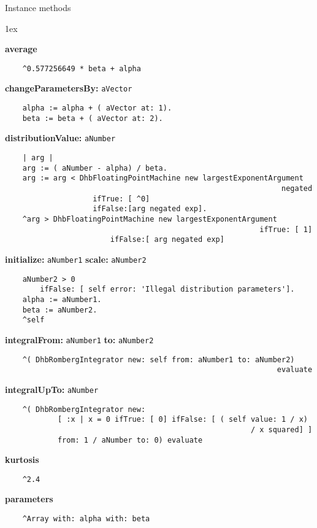 Instance methods
{\parskip 1ex\par\noindent}
{\bf average}
\begin{verbatim}
    ^0.577256649 * beta + alpha

\end{verbatim}
{\bf changeParametersBy:} {\tt aVector}
\begin{verbatim}
    alpha := alpha + ( aVector at: 1).
    beta := beta + ( aVector at: 2).

\end{verbatim}
{\bf distributionValue:} {\tt aNumber}
\begin{verbatim}
    | arg |
    arg := ( aNumber - alpha) / beta.
    arg := arg < DhbFloatingPointMachine new largestExponentArgument 
                                                               negated
                    ifTrue: [ ^0]
                    ifFalse:[arg negated exp].
    ^arg > DhbFloatingPointMachine new largestExponentArgument 
                                                          ifTrue: [ 1]
                        ifFalse:[ arg negated exp]

\end{verbatim}
{\bf initialize:} {\tt aNumber1} {\bf scale:} {\tt aNumber2}
\begin{verbatim}
    aNumber2 > 0
        ifFalse: [ self error: 'Illegal distribution parameters'].
    alpha := aNumber1.
    beta := aNumber2.
    ^self

\end{verbatim}
{\bf integralFrom:} {\tt aNumber1} {\bf to:} {\tt aNumber2}
\begin{verbatim}
    ^( DhbRombergIntegrator new: self from: aNumber1 to: aNumber2) 
                                                              evaluate

\end{verbatim}
{\bf integralUpTo:} {\tt aNumber}
\begin{verbatim}
    ^( DhbRombergIntegrator new:
            [ :x | x = 0 ifTrue: [ 0] ifFalse: [ ( self value: 1 / x) 
                                                        / x squared] ]
            from: 1 / aNumber to: 0) evaluate

\end{verbatim}
{\bf kurtosis}
\begin{verbatim}
    ^2.4

\end{verbatim}
{\bf parameters}
\begin{verbatim}
    ^Array with: alpha with: beta

\end{verbatim}
